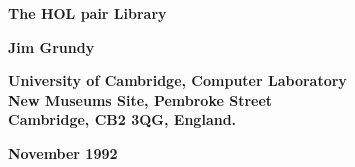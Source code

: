 
\begin{titlepage}

\setcounter{page}{1}                      %


\mbox{}
\vskip20mm
\begin{center}
{\Huge\bf The HOL pair Library}
\end{center}


\vskip15mm
\begin{center}
\large\bf Jim Grundy
\end{center}


\vfill
\begin{center}
\bf
University of Cambridge, Computer Laboratory\\
New Museums Site, Pembroke Street\\
Cambridge, {\small\bf CB}2 3{\small\bf QG}, England.
\end{center}


\vskip5mm
\begin{center}
\bf November 1992
\end{center}

\end{titlepage}

\thispagestyle{empty}
\mbox{}


